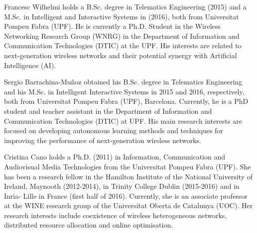 \documentclass[comsoc]{IEEEtran}
\begin{document}
	\begin{IEEEbiography}{Francesc Wilhelmi} holds a B.Sc. degree in Telematics Engineering (2015) and a M.Sc. in Intelligent and Interactive Systems in (2016), both from Universitat Pompeu Fabra (UPF). He is currently a Ph.D. Student in the Wireless Networking Research Group (WNRG) in the Department of Information and Communication Technologies (DTIC) at the UPF. His interests are related to next-generation wireless networks and their potential synergy with Artificial Intelligence (AI).
	\end{IEEEbiography}
	
	\begin{IEEEbiography}{Sergio Barrachina-Mu\~noz} obtained his B.Sc. degree in Telematics Engineering and his M.Sc. in Intelligent Interactive Systems in 2015 and 2016, respectively, both from Universitat Pompeu Fabra (UPF), Barcelona. Currently, he is a PhD student and teacher assistant in the Department of Information and Communication Technologies (DTIC) at UPF. His main research interests are focused on developing autonomous learning methods and techniques for improving the performance of next-generation wireless networks.
	\end{IEEEbiography}
	
	\begin{IEEEbiography}{Cristina Cano} holds a Ph.D. (2011) in Information, Communication and Audiovisual Media Technologies from the Universitat Pompeu Fabra (UPF). She has been a research fellow in the Hamilton Institute of the National University of Ireland, Maynooth (2012-2014), in Trinity College Dublin (2015-2016) and in Inria- Lille in France (first half of 2016). Currently, she is an associate professor at the WINE research group of the Universitat Oberta de Catalunya (UOC). Her research interests include coexistence of wireless heterogeneous networks, distributed resource allocation and online optimisation. 
	\end{IEEEbiography}
	
\end{document}
